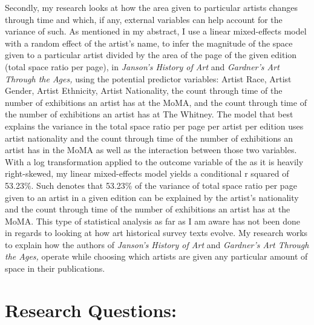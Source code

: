 \documentclass[
  letterpaper,
  DIV=11,
  numbers=noendperiod]{scrreprt}
\begin{document}
Secondly, my research looks at how the area given to particular artists
changes through time and which, if any, external variables can help
account for the variance of such. As mentioned in my abstract, I use a
linear mixed-effects model with a random effect of the artist's name, to
infer the magnitude of the space given to a particular artist divided by
the area of the page of the given edition (total space ratio per page),
in \emph{Janson's History of Art} and \emph{Gardner's Art Through the
Ages,} using the potential predictor variables: Artist Race, Artist
Gender, Artist Ethnicity, Artist Nationality, the count through time of
the number of exhibitions an artist has at the MoMA, and the count
through time of the number of exhibitions an artist has at The Whitney.
The model that best explains the variance in the total space ratio per
page per artist per edition uses artist nationality and the count
through time of the number of exhibitions an artist has in the MoMA as
well as the interaction between those two variables. With a log
transformation applied to the outcome variable of the as it is heavily
right-skewed, my linear mixed-effects model yields a conditional r
squared of 53.23\%. Such denotes that 53.23\% of the variance of total
space ratio per page given to an artist in a given edition can be
explained by the artist's nationality and the count through time of the
number of exhibitions an artist has at the MoMA. This type of
statistical analysis as far as I am aware has not been done in regards
to looking at how art historical survey texts evolve. My research works
to explain how the authors of \emph{Janson's History of Art} and
\emph{Gardner's Art Through the Ages,} operate while choosing which
artists are given any particular amount of space in their publications.

\hypertarget{research-questions}{%
\chapter{\texorpdfstring{\textbf{Research
Questions:}}{Research Questions:}}\label{research-questions}}
\end{document}
